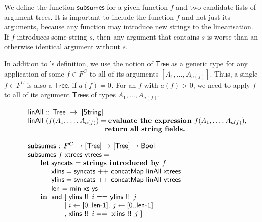 We define the function $\textsf{subsumes}$ for a given function $f$
and two candidate lists of argument trees. It is important to include
the function $f$ and not just its arguments, because any \gf{}
function may introduce new strings to the linearisation. If $f$
introduces some string $s$, then any argument that contains $s$ is
worse than an otherwise identical argument without $s$.

In addition to \citet{angelov2010phd}'s definition, we use the notion of
$\textsf{Tree}$ as a generic type for any application of some
$f \in F^C$ to all of its arguments $[A_1, \dots, A_{a(f)}]$.  Thus, a
single $f \in F^C$ is also a $\textsf{Tree}$, if $a(f) = 0$. For an
$f$ with $a(f) > 0$, we need to apply $f$ to all of its argument
$\textsf{Tree}$s of types $A_1, \ldots, A_{a(f)}$.


\begin{figure}[h]
\begin{EmptyItem}
$\begin{array}{p{0.25cm} p{0.2cm} p{0.3cm} p{1.65cm} l}
\multicolumn{5}{l}{\textsf{linAll :: Tree } \rightarrow \textsf{ [String]}} \\
\multicolumn{5}{l}{\textsf{linAll }(f(A_1,\ldots,A_{a(f)}) = \textbf{evaluate the expression } f (A_1,\ldots,A_{a(f)}),} \\
             &          &             &                     & \textbf{return all string fields.} \\
\\
\multicolumn{5}{l}{\textsf{subsumes : }F^C \rightarrow \textsf{[Tree]} \rightarrow \textsf{[Tree]} \rightarrow \textsf{Bool}} \\
\multicolumn{5}{l}{\textsf{subsumes } f \textsf{ xtrees ytrees} =} \\
 & \textbf{let} & \multicolumn{3}{l}{\textsf{syncats = } \textbf{strings introduced by } f} \\
 &              & \multicolumn{3}{l}{\textsf{xlins} = \textsf{syncats} \text{ ++ } \textsf{concatMap linAll
                  xtrees}} \\
 &              & \multicolumn{3}{l}{\textsf{ylins} =  \textsf{syncats} \text{ ++ } \textsf{concatMap linAll
                  ytrees}} \\
 &              & \multicolumn{3}{l}{\textsf{len = min xs ys}} \\ 
 & \textbf{in}  & \multicolumn{3}{l}{\textsf{and [ ylins !! } i  \text{ ==} \textsf{ ylins !! } j} \\
 &              &  & \multicolumn{2}{l}{\textsf{| } i \leftarrow \textsf{[0..len-1], } j \leftarrow \textsf{[0..len-1]}} \\
 &              &  & \multicolumn{2}{l}{\textsf{, xlins !! } i == \textsf{ xlins !! } j \textsf{ ]}} \\
\end{array}$
\end{EmptyItem}
\end{figure}


